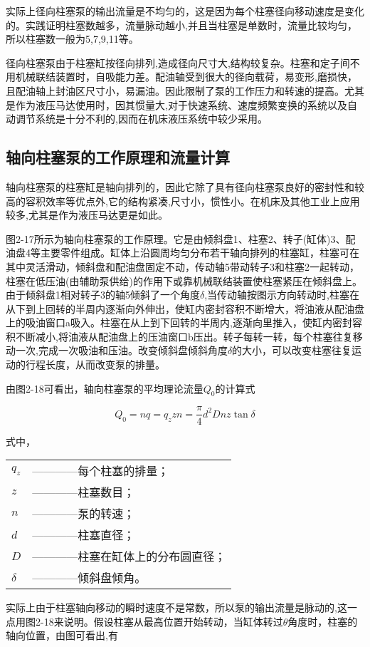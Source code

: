 实际上径向柱塞泵的输出流量是不均匀的，这是因为每个柱塞径向移动速度是变化的。实践证明柱塞数越多，流量脉动越小,并且当柱塞是单数时，流量比较均匀，所以柱塞数一般为5,7,9,11等。

径向柱塞泵由于柱塞缸按径向排列,造成径向尺寸大,结构较复杂。柱塞和定子间不用机械联结装置时，自吸能力差。配油轴受到很大的径向载荷，易变形,磨损快，且配油轴上封油区尺寸小，易漏油。因此限制了泵的工作压力和转速的提高。尤其是作为液压马达使用时，因其惯量大,对于快速系统、速度频繁变换的系统以及自动调节系统是十分不利的,因而在机床液压系统中较少采用。

\subsection{轴向柱塞泵的工作原理和流量计算}

轴向柱塞泵的柱塞缸是轴向排列的，因此它除了具有径向柱塞泵良好的密封性和较高的容积效率等优点外,它的结构紧凑,尺寸小，惯性小。在机床及其他工业上应用较多,尤其是作为液压马达更是如此。

图2-17所示为轴向柱塞泵的工作原理。它是由倾斜盘1、柱塞2、转子(缸体)3、配油盘4等主要零件组成。缸体上沿圆周均匀分布若干轴向排列的柱塞缸，柱塞可在其中灵活滑动，倾斜盘和配油盘固定不动，传动轴5带动转子3和柱塞2一起转动，柱塞在低压油(由辅助泵供给)的作用下或靠机械联结装置使柱塞紧压在倾斜盘上。由于倾斜盘1相对转子3的轴5倾斜了一个角度$\delta $,当传动轴按图示方向转动时,柱塞在从下到上回转的半周内逐渐向外伸出，使缸内密封容积不断增大，将油液从配油盘上的吸油窗口a吸入。柱塞在从上到下回转的半周内,逐渐向里推入，使缸内密封容积不断减小,将油液从配油盘上的压油窗口b压出。转子每转一转，每个柱塞往复移动一次,完成一次吸油和压油。改变倾斜盘倾斜角度$\delta $的大小，可以改变柱塞往复运动的行程长度，从而改变泵的排量。

由图2-18可看出，轴向柱塞泵的平均理论流量$Q_{0}$的计算式

\begin{equation}
Q_{0}=nq=q_{z}zn=\frac{\pi}{4}d^{2}Dnz\tan \delta  
\end{equation}

\noindent 式中， 
\begin{tabular}[t]{ll}
 $q_{z}$ & ————每个柱塞的排量； \\
 $z$ & ————柱塞数目； \\
 $n$ & ————泵的转速； \\
 $d$ & ————柱塞直径； \\
 $D$ & ————柱塞在缸体上的分布圆直径； \\
 $\delta $ & ————倾斜盘倾角。
\end{tabular}

实际上由于柱塞轴向移动的瞬时速度不是常数，所以泵的输出流量是脉动的,这一点用图2-18来说明。假设柱塞从最高位置开始转动，当缸体转过$\theta $角度时，柱塞的轴向位置，由图可看出,有

